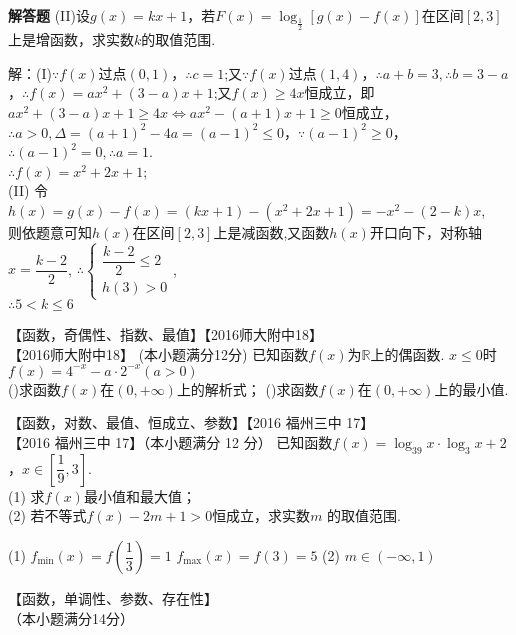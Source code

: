 \begin{exercise}{\bf 解答题}
      (II)设$g(x)=kx+1$，若$F(x)=\log_{\frac{1}2}[g(x)-f(x)]$在区间$[2,3]$上是增函数，求实数$k$的取值范围.\\
      \begin{answer}
        解：(I)$\because f(x)$过点$(0,1)$，$\therefore c=1$;又$\because f(x)$过点$(1,4)$，$\therefore a+b=3,\therefore b=3-a$，$\therefore f(x)=ax^2+(3-a)x+1$;又$f(x)\geq 4x$恒成立，即\\
        $ax^2+(3-a)x+1\geq 4x\Leftrightarrow ax^2-(a+1)x+1\geq 0$恒成立，$\therefore a>0,\Delta=(a+1)^2-4a=(a-1)^2\leq 0$，$\because (a-1)^2\geq 0$，$\therefore (a-1)^2=0,\therefore a=1$.\\
        $\therefore f(x)=x^2+2x+1$;\\
        (II) 令$h(x)=g(x)-f(x)=(kx+1)-(x^2+2x+1)=-x^2-(2-k)x$,\\
        则依题意可知$h(x)$在区间$[2,3]$上是减函数,又函数$h(x)$开口向下，对称轴$x=\dfrac{k-2}2$,
        $\therefore
        \begin{cases}
          \dfrac{k-2}2\leq 2\\
          h(3)>0
        \end{cases}$,\\
        $\therefore 5<k\leq 6$\\
      \end{answer}
    \item 【函数，奇偶性、指数、最值】【2016师大附中18】\\
      【2016师大附中18】 (本小题满分12分)
      已知函数$f(x)$为$\mathbb{R}$上的偶函数. $x\leq0$时$f(x)=4^{-x}-a\cdot 2^{-x}(a>0)$\\
      ()求函数$f(x)$在$(0,+\infty)$上的解析式；
      ()求函数$f(x)$在$(0,+\infty)$上的最小值.
    \item 【函数，对数、最值、恒成立、参数】【2016 福州三中 17】\\
      【2016 福州三中 17】（本小题满分 12 分）
      已知函数$f(x)=\log_39x\cdot\log_3x+2 $，$x\in[\dfrac19,3]$.\\
      (1) 求$f(x)$最小值和最大值；\\
      (2) 若不等式$f(x)-2m+1>0 $恒成立，求实数$m$ 的取值范围.
      \begin{answer}
        (1) $f_{\min}(x)=f(\dfrac13)=1$
              $f_{\max}(x)=f(3)=5$
        (2) $m\in(-\infty,1)$
      \end{answer}
    \item 【函数，单调性、参数、存在性】\\
      （本小题满分14分）\\

\end{exercise}
